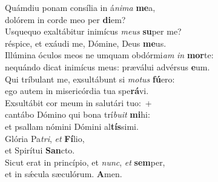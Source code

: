 \evenverse Quámdiu ponam consília in á\textit{ni}\textit{ma} \textbf{me}a,~\*\\
\evenverse dolórem in corde meo per \textbf{di}em?\\
\oddverse Usquequo exaltábitur inimícus \textit{me}\textit{us} \textbf{su}per me?~\*\\
\oddverse réspice, et exáudi me, Dómine, Deus \textbf{me}us.\\
\evenverse Illúmina óculos meos ne umquam obdórmi\textit{am} \textit{in} \textbf{mor}te:~\*\\
\evenverse nequándo dicat inimícus meus: præválui advérsus \textbf{e}um.\\
\oddverse Qui tríbulant me, exsultábunt si \textit{mo}\textit{tus} \textbf{fú}ero:~\*\\
\oddverse ego autem in misericórdia tua spe\textbf{rá}vi.\\
\evenverse Exsultábit cor meum in salutári tuo:~+\\
\evenverse  cantábo Dómino qui bona trí\textit{bu}\textit{it} \textbf{mi}hi:~\*\\
\evenverse et psallam nómini Dómini al\textbf{tís}simi.\\
\oddverse Glória Pa\textit{tri}, \textit{et} \textbf{Fí}lio,~\*\\
\oddverse et Spirítui \textbf{San}cto.\\
\evenverse Sicut erat in princípio, et \textit{nunc}, \textit{et} \textbf{sem}per,~\*\\
\evenverse et in sǽcula sæculórum. \textbf{A}men.\\
